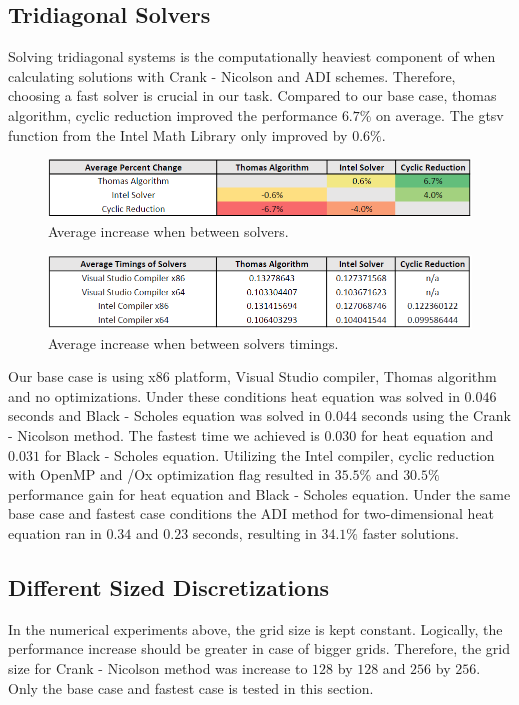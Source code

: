 \documentclass[12pt, oneside]{book}
\theoremstyle{plain}
\theoremstyle{definition}
\begin{document}
\subsection{Tridiagonal Solvers}
Solving tridiagonal systems is the computationally heaviest component of when calculating solutions with Crank - Nicolson and ADI schemes. Therefore, choosing a fast solver is crucial in our task. Compared to our base case, thomas algorithm, cyclic reduction improved the performance $6.7 \%$ on average. The gtsv function from the Intel Math Library only improved by $0.6 \%$. 

 \begin{figure}[!htb]
    \centering
        \includegraphics[scale=0.7]{solverAveragePercentage.png}
    \caption{Average increase when between solvers.}
\end{figure}
\begin{figure}[!htb]
    \centering
        \includegraphics[scale=0.6]{solverAverage.png}
    \caption{Average increase when between solvers timings.}
\end{figure}

Our base case is using x86 platform, Visual Studio compiler, Thomas algorithm and no optimizations. Under these conditions heat equation was solved in $0.046$ seconds and Black - Scholes equation was solved in $0.044$ seconds using the Crank - Nicolson method. The fastest time we achieved is $0.030$ for heat equation and $0.031$ for Black - Scholes equation. Utilizing the Intel compiler, cyclic reduction with OpenMP and /Ox optimization flag resulted in $35.5 \%$ and $30.5 \%$ performance gain for heat equation and Black - Scholes equation. Under the same base case and fastest case conditions the ADI method for two-dimensional heat equation ran in $0.34$ and $0.23$ seconds, resulting in $34.1 \%$ faster solutions.

\subsection{Different Sized Discretizations} 
In the numerical experiments above, the grid size is kept constant. Logically, the performance increase should be greater in case of bigger grids. Therefore, the grid size for Crank - Nicolson method was increase to $128$ by $128$ and $256$ by $256$. Only the base case and fastest case is tested in this section.
\end{document}
